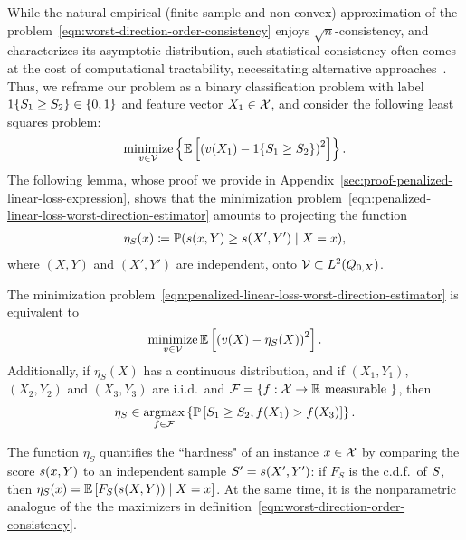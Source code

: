 While the natural empirical (finite-sample and non-convex) approximation of
the problem~\eqref{eqn:worst-direction-order-consistency} enjoys
$\sqrt{n}$-consistency, and \citet{Sherman94} characterizes its asymptotic
distribution, such statistical consistency often comes at the cost of
computational tractability, necessitating alternative
approaches~\cite{ClemenconLuVa08, DuchiMaJo13}.  Thus, we reframe our
problem as a binary classification problem with label $1\!\left\{S_1 \ge
  S_2\right\} \in \{0,1\}$ and feature vector $X_1 \in \mathcal{X}$, and consider
the following least squares problem:
\begin{align}
  \label{eqn:penalized-linear-loss-worst-direction-estimator}
  \mathop{\rm minimize}_{\substack{v \in \mathcal{V}}} \left\{  \mathbb{E}\left[ 
    \left( v(X_1) - 1\!\left\{S_1 \ge S_2\right\} \right)^2  \right] \right\}.
\end{align}
The following lemma, whose proof we provide in
Appendix~\ref{sec:proof-penalized-linear-loss-expression}, shows that the
minimization
problem~\eqref{eqn:penalized-linear-loss-worst-direction-estimator} amounts
to projecting the function
\begin{align*}
  \eta_S (x) \coloneqq \mathbb{P}( s(x,Y) \ge s(X',Y') \mid X=x),
\end{align*}
where $(X, Y)$ and $(X', Y')$ are independent,
onto $\mathcal{V} \subset L^2(Q_{0,X})$.

\begin{lemma}
  \label{lemma:penalized-linear-loss-expression}
  The minimization
  problem~\eqref{eqn:penalized-linear-loss-worst-direction-estimator} is
  equivalent to
  \begin{align*}
    \mathop{\rm minimize}_{\substack{v \in \mathcal{V}}} \mathbb{E}\left[ \left( v(X) - \eta_S(X) \right)^2 \right].
  \end{align*}
  Additionally, if $\eta_S(X)$ has a continuous distribution, and if
  $(X_1,Y_1)$, $(X_2, Y_2)$ and $(X_3, Y_3)$ are i.i.d.\ and $\mathcal{F} = \{ f:
  \mathcal{X} \to \mathbb{R} \text{ measurable } \}$, then
  \begin{align*}
    \eta_S \in \mathop{\rm argmax}_{f \in \mathcal{F}} \left\{\mathbb{P}\left[ S_1 \ge S_2,  f(X_1) > f(X_3) \right] \right\} .
  \end{align*}
\end{lemma}

The function $\eta_S$ quantifies the ``hardness" of an instance $x \in
\mathcal{X}$ by comparing the score $s(x,Y)$ to an independent sample
$S' = s(X', Y')$: if $F_S$ is the c.d.f.\ of $S$, then
$\eta_S(x) = \mathbb{E} \left[ F_{S}(s(X,Y)) \mid X=x \right]$.  At the
same time, it is the nonparametric
analogue of the the maximizers in
definition~\eqref{eqn:worst-direction-order-consistency}.

